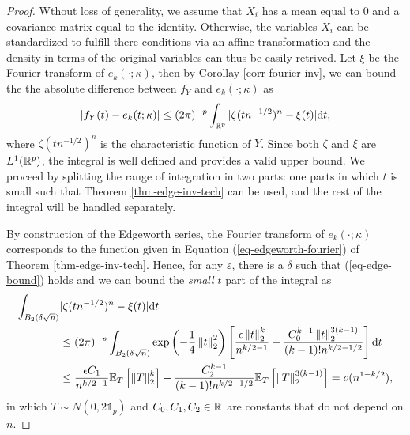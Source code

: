 \begin{proof}
    Wthout loss of generality, we assume that $X_i$ has a mean equal to 0 and a covariance matrix equal to the identity. Otherwise, the variables $X_i$ can be standardized to fulfill there conditions via an affine transformation and the density in terms of the original variables can thus be easily retrived. Let $\xi$ be the Fourier transform of $e_k(\cdot; \kappa)$, then by Corollay \ref{corr-fourier-inv}, we can bound the the absolute difference between $f_Y$ and $e_k(\cdot; \kappa)$ as
    \begin{equation*}
        |f_Y(t) - e_k(t; \kappa)| \leq (2\pi)^{-p}\intRp{t}{|\zeta(tn^{-1/2})^n - \xi(t)|},
    \end{equation*}
    where $\zeta(tn^{-1/2})^n$ is the characteristic function of $Y$. Since both $\zeta$ and $\xi$ are $L^1(\Rp)$, the integral is well defined and provides a valid upper bound. We proceed by splitting the range of integration in two parts: one parts in which $t$ is small such that Theorem \ref{thm-edge-inv-tech} can be used, and the rest of the integral will be handled separately.

    By construction of the Edgeworth series, the Fourier transform of $e_k(\cdot; \kappa)$ corresponds to the function given in Equation (\ref{eq-edgeworth-fourier}) of Theorem \ref{thm-edge-inv-tech}. Hence, for any $\varepsilon$, there is a $\delta$ such that (\ref{eq-edge-bound}) holds and we can bound the \textit{small $t$} part of the integral as
    \begin{align*}
        \int_{B_2(\delta\sqrt{n})} &|\zeta(tn^{-1/2})^n - \xi(t)| \d t\\
        &\leq (2\pi)^{-p}\int_{B_2(\delta\sqrt{n})}\expf{-\frac{1}{4}\norm{t}_2^2}\left[ \frac{\epsilon\norm{t}_2^k}{n^{k/2-1}} + \frac{C_0^{k-1}\norm{t}_2^{3(k-1)}}{(k-1)!n^{k/2-1/2}} \right] \d t \\
        &\leq \frac{\epsilon C_1}{n^{k/2-1}}\expec{T}{\norm{T}^k_2} + \frac{C_2^{k-1}}{(k-1)!n^{k/2-1/2}}\expec{T}{\norm{T}_2^{3(k-1)}}
        = o(n^{1-k/2}),
    \end{align*}
    in which $T \sim N(0, 2\mathbb{1}_p)$ and $C_0, C_1, C_2 \in \R$ are constants that do not depend on $n$. 


\end{proof}
